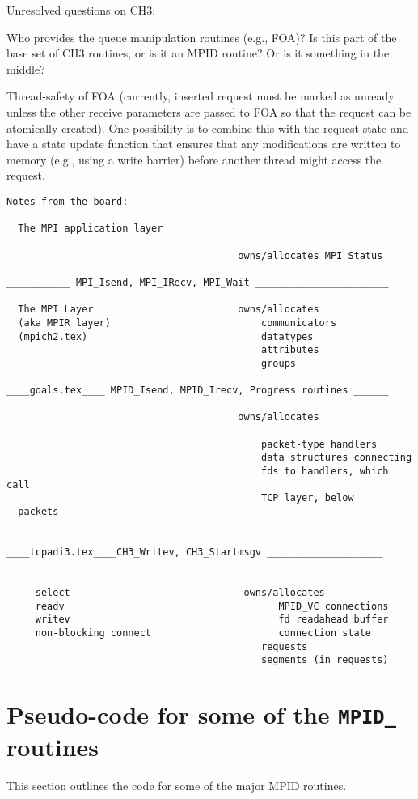 \documentclass{article}
\def\code#1{\texttt{#1}}
\begin{document}
Unresolved questions on CH3:

Who provides the queue manipulation routines (e.g., FOA)?  Is this part of the
base set of CH3 routines, or is it an MPID routine?  Or is it
something in the middle?  

Thread-safety of FOA (currently, inserted request must be marked as unready
unless the other receive parameters are passed to FOA so that the request can
be atomically created).  One possibility is to combine this with the request
state and have a state update function that ensures that any modifications are
written to memory (e.g., using a write barrier) before another thread might
access the request.


\begin{verbatim}
Notes from the board:

  The MPI application layer

                                        owns/allocates MPI_Status

___________ MPI_Isend, MPI_IRecv, MPI_Wait _______________________

  The MPI Layer                         owns/allocates
  (aka MPIR layer)                          communicators
  (mpich2.tex)                              datatypes
                                            attributes
                                            groups

____goals.tex____ MPID_Isend, MPID_Irecv, Progress routines ______

                                        owns/allocates

                                            packet-type handlers
                                            data structures connecting
                                            fds to handlers, which call
                                            TCP layer, below 
  packets


____tcpadi3.tex____CH3_Writev, CH3_Startmsgv ____________________


     select                              owns/allocates
     readv                                     MPID_VC connections
     writev                                    fd readahead buffer
     non-blocking connect                      connection state
                                            requests
                                            segments (in requests)

\end{verbatim}

\section{Pseudo-code for some of the \code{MPID_} routines}
This section outlines the code for some of the major MPID routines.
\end{document}
